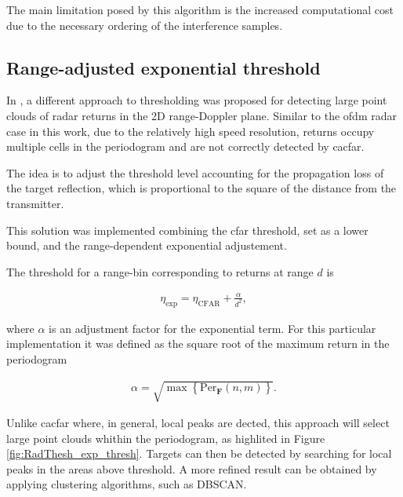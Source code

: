 The main limitation posed by this algorithm is the increased computational cost due to the necessary ordering of the interference samples.


\subsection{Range-adjusted exponential threshold}

	
	In \cite{Wagner_Feger_Stelzer_2017}, a different approach to thresholding was proposed for detecting large point clouds of radar returns in the 2D range-Doppler plane. Similar to the \gls{ofdm} radar case in this work, due to the relatively high speed resolution, returns occupy multiple cells in the periodogram and are not correctly detected by \gls{cacfar}.
	
	The idea is to adjust the threshold level accounting for the propagation loss of the target reflection, which is proportional to the square of the distance from the transmitter. 
	
	This solution was implemented combining the \gls{cfar} threshold, set as a lower bound, and the range-dependent exponential adjustement.
	
	The threshold for a range-bin corresponding to returns at range $d$ is
	
	\begin{align*}
		\eta_{\text{exp}} = \eta_{\text{CFAR}} + \frac{\alpha}{d^2},
	\end{align*} 
	
	where $\alpha$ is an adjustment factor for the exponential term. For this particular implementation it was defined as the square root of the maximum return in the periodogram
	
	\begin{align*}
		\alpha = \sqrt{\max{ \left\{\text{Per}_{\mathbf F}(n,m)\right\} }}.
	\end{align*}
	
	Unlike \gls{cacfar} where, in general, local peaks are dected, this approach will select large point clouds whithin the periodogram, as highlited in Figure \ref{fig:RadThesh_exp_thresh}.
	Targets can then be detected by searching for local peaks in the areas above threshold. A more refined result can be obtained by applying clustering algorithms, such as DBSCAN.
	
